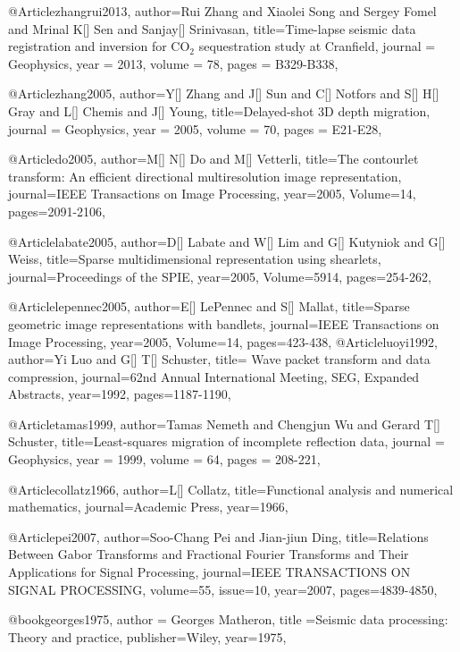 @Article{zhangrui2013,
  author={Rui Zhang and Xiaolei Song and Sergey Fomel and Mrinal K[] Sen and Sanjay[] Srinivasan},
  title={Time-lapse seismic data registration and inversion for {CO}$_2$ sequestration study at Cranfield},
  journal = 	 {Geophysics},
  year = 	 2013,
  volume =	 78,
  pages =	 {B329-B338},
}

@Article{zhang2005,
  author={Y[] Zhang and J[] Sun and C[] Notfors and S[] H[] Gray and L[] Chemis and J[] Young},
  title={Delayed-shot 3{D} depth migration},
  journal = 	 {Geophysics},
  year = 	 2005,
  volume =	 70,
  pages =	 {E21-E28},
}

@Article{do2005,
  author={M[] N[] Do and M[] Vetterli},
  title={The contourlet transform: An efficient directional multiresolution image representation},
  journal={IEEE Transactions on Image Processing},
  year=2005,
  Volume=14,
  pages={2091-2106},
}

@Article{labate2005,
  author={D[] Labate and W[] Lim and G[] Kutyniok and G[] Weiss},
  title={Sparse multidimensional representation using shearlets},
  journal={Proceedings of the SPIE},
  year=2005,
  Volume=5914,
  pages={254-262},
}

@Article{lepennec2005,
  author={E[] LePennec and S[] Mallat},
  title={Sparse geometric image representations with bandlets},
  journal={IEEE Transactions on Image Processing},
  year=2005,
  Volume=14,
  pages={423-438},
}
@Article{luoyi1992,
  author={Yi Luo and G[] T[] Schuster},
  title={	Wave packet transform and data compression},
  journal={62nd Annual International Meeting, SEG, Expanded Abstracts},
  year=1992,
  pages={1187-1190},
}

@Article{tamas1999,
  author={Tamas Nemeth and Chengjun Wu and Gerard T[] Schuster},
  title={Least-squares migration of incomplete reflection data},
  journal = 	 {Geophysics},
  year = 	 1999,
  volume =	 64,
  pages =	 {208-221},
}

@Article{collatz1966,
author={L[] Collatz},
title={Functional analysis and numerical mathematics},
journal={Academic Press},
year=1966,
}

@Article{pei2007,
author={Soo-Chang Pei and Jian-jiun Ding},
title={Relations Between Gabor Transforms and Fractional Fourier Transforms and Their Applications for Signal Processing},
journal={IEEE TRANSACTIONS ON SIGNAL PROCESSING},
volume=55,
issue=10,
year=2007,
pages={4839-4850},
}

@book{georges1975,
  author = {Georges Matheron},
  title ={Seismic data processing: Theory and practice},
  publisher={Wiley},
  year=1975,
}

